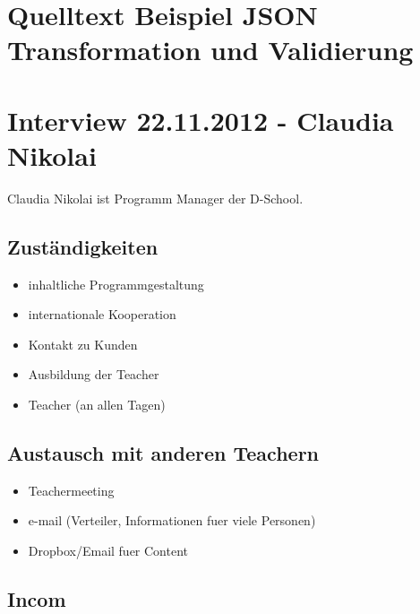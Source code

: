 \label{app:anhang}

\section{Quelltext Beispiel JSON Transformation und Validierung}



\section{Interview 22.11.2012 - Claudia Nikolai }
\label{sec:interview_nikolai}
Claudia Nikolai ist Programm Manager der D-School.

\subsection*{Zuständigkeiten}
\label{zustaendigkeiten}

\begin{itemize}
\item inhaltliche Programmgestaltung
\item internationale Kooperation
\item Kontakt zu Kunden
\item Ausbildung der Teacher
\item Teacher (an allen Tagen)
\end{itemize}

\subsection*{Austausch mit anderen Teachern}
\label{austauschmitanderenteachern}

\begin{itemize}
\item Teachermeeting
\item e-mail (Verteiler, Informationen fuer viele Personen)
\item Dropbox\slash Email fuer Content
\end{itemize}

\subsection*{Incom}
\label{incom}

